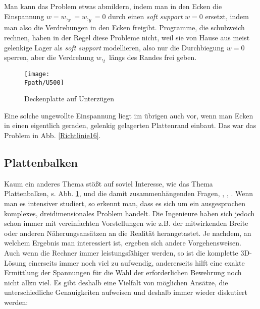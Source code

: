 Man kann das Problem etwas abmildern, indem man in den Ecken die Einspannung $w = w,_x = w,_y = 0$ durch einen {\em soft support\/} $w = 0$ ersetzt, indem man also die Verdrehungen in den Ecken freigibt. Programme, die schubweich rechnen, haben in der Regel diese Probleme nicht, weil sie von Hause aus meist gelenkige Lager als {\em soft support\/} modellieren, also nur die Durchbiegung $w = 0$ sperren, aber die Verdrehung $w,_t$ l\"{a}ngs des Randes frei geben.
\begin{figure}[tbp]
\centering
\if {} \sidecaption \fi
\texttt{[image: \\Fpath/U500]}
\caption{Deckenplatte auf Unterz\"{u}gen}
\label{U500}
\end{figure}%

Eine solche ungewollte Einspannung liegt im \"{u}brigen auch vor, wenn man Ecken in einen eigentlich geraden, gelenkig gelagerten Plattenrand einbaut. Das war das Problem in Abb. \ref{Richtlinie16}.

{\textcolor{sectionTitleBlue}{\section{Plattenbalken}}}\label{Plattenbalken}
Kaum ein anderes Thema st\"{o}{\ss}t auf soviel Interesse, wie das Thema Plattenbalken, s. Abb. \ref{U500}, und die damit zusammenh\"{a}ngenden Fragen, \cite{Katz1}, \cite{Werkle}, \cite{Wu1}. Wenn man es intensiver studiert, so erkennt man, dass es sich um ein ausgesprochen komplexes, dreidimensionales Problem handelt. Die Ingenieure haben sich jedoch schon immer mit vereinfachten Vorstellungen wie z.B. der mitwirkenden Breite oder anderen N\"{a}herungsans\"{a}tzen an die Realit\"{a}t herangetastet. Je nachdem, an welchem Ergebnis man interessiert ist, ergeben sich andere Vorgehensweisen. Auch wenn die Rechner immer leistungsf\"{a}higer werden, so ist die komplette 3D-L\"{o}sung einerseits immer noch viel zu aufwendig, andererseits hilft eine exakte Ermittlung der Spannungen f\"{u}r die Wahl der erforderlichen Bewehrung noch nicht allzu viel. Es gibt deshalb eine Vielfalt von m\"{o}glichen Ans\"{a}tze, die unterschiedliche Genauigkeiten aufweisen und deshalb immer wieder diskutiert werden:\\

